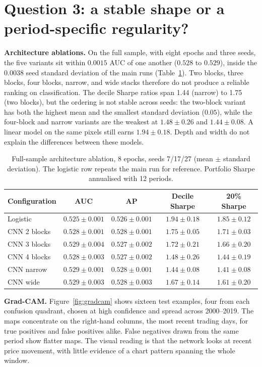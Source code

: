 \documentclass[10pt]{article}
\begin{document}
\section{Question 3: a stable shape or a period-specific regularity?}

\textbf{Architecture ablations.} On the full sample, with eight epochs and three seeds, the five variants sit within $0.0015$ AUC of one another ($0.528$ to $0.529$), inside the $0.0038$ seed standard deviation of the main runs (Table~\ref{tab:ablation}). Two blocks, three blocks, four blocks, narrow, and wide stacks therefore do not produce a reliable ranking on classification. The decile Sharpe ratios span 1.44 (narrow) to 1.75 (two blocks), but the ordering is not stable across seeds: the two-block variant has both the highest mean and the smallest standard deviation ($0.05$), while the four-block and narrow variants are the weakest at $1.48\pm0.26$ and $1.44\pm0.08$. A linear model on the same pixels still earns $1.94\pm0.18$. Depth and width do not explain the differences between these models.

\begin{table}[h!]
\centering
\small
\caption{Full-sample architecture ablation, 8 epochs, seeds 7/17/27 (mean $\pm$ standard deviation). The logistic row repeats the main run for reference. Portfolio Sharpe annualised with 12 periods.}
\label{tab:ablation}
\begin{tabular}{lcccc}
\toprule
Configuration & AUC & AP & Decile Sharpe & 20\% Sharpe \\
\midrule
Logistic         & $0.525\pm0.001$ & $0.526\pm0.001$ & $1.94\pm0.18$ & $1.85\pm0.12$ \\
CNN 2 blocks     & $0.528\pm0.001$ & $0.528\pm0.001$ & $1.75\pm0.05$ & $1.71\pm0.03$ \\
CNN 3 blocks     & $0.529\pm0.004$ & $0.527\pm0.002$ & $1.72\pm0.21$ & $1.66\pm0.20$ \\
CNN 4 blocks     & $0.528\pm0.003$ & $0.527\pm0.002$ & $1.48\pm0.26$ & $1.44\pm0.19$ \\
CNN narrow       & $0.529\pm0.001$ & $0.528\pm0.001$ & $1.44\pm0.08$ & $1.41\pm0.08$ \\
CNN wide         & $0.529\pm0.003$ & $0.528\pm0.003$ & $1.67\pm0.14$ & $1.61\pm0.20$ \\
\bottomrule
\end{tabular}
\end{table}

\textbf{Grad-CAM.} Figure~\ref{fig:gradcam} shows sixteen test examples, four from each confusion quadrant, chosen at high confidence and spread across 2000--2019. The maps concentrate on the right-hand columns, the most recent trading days, for true positives and false positives alike. False negatives drawn from the same period show flatter maps. The visual reading is that the network looks at recent price movement, with little evidence of a chart pattern spanning the whole window.
\end{document}
